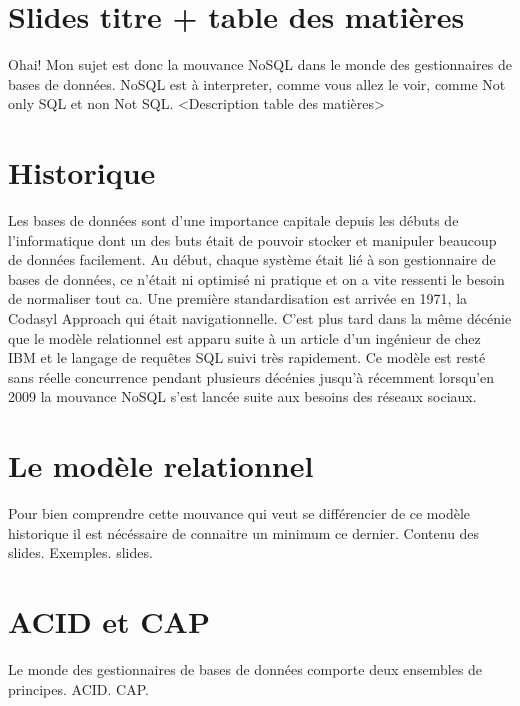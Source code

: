 \documentclass[11pt]{article}
\author{Contzen Laurent}
\begin{document}
\section{Slides titre + table des matières}
Ohai! Mon sujet est donc la mouvance NoSQL dans le monde des gestionnaires de bases de données. NoSQL est à interpreter, comme vous allez le voir, comme Not only SQL et non Not SQL. <Description table des matières>
\section{Historique}
Les bases de données sont d'une importance capitale depuis les débuts de l'informatique dont un des buts était de pouvoir stocker et manipuler beaucoup de données facilement. Au début, chaque système était lié à son gestionnaire de bases de données, ce n'était ni optimisé ni pratique et on a vite ressenti le besoin de normaliser tout ca. Une première standardisation est arrivée en 1971, la Codasyl Approach qui était navigationnelle. C'est plus tard dans la même décénie que le modèle relationnel est apparu suite à un article d'un ingénieur de chez IBM et le langage de requêtes SQL suivi très rapidement. Ce modèle est resté sans réelle concurrence pendant plusieurs décénies jusqu'à récemment lorsqu'en 2009 la mouvance NoSQL s'est lancée suite aux besoins des réseaux sociaux.
\section{Le modèle relationnel}
Pour bien comprendre cette mouvance qui veut se différencier de ce modèle historique il est nécéssaire de connaitre un minimum ce dernier. Contenu des slides. Exemples. slides.
\section{ACID et CAP}
Le monde des gestionnaires de bases de données comporte deux ensembles de principes. ACID. CAP.
\end{document}
